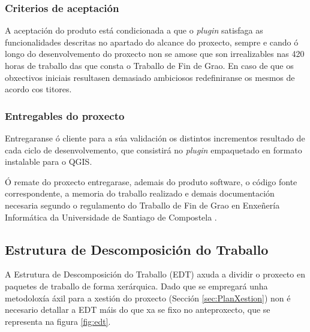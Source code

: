 \subsubsection{Criterios de aceptación}
A aceptación do produto está condicionada a que o \emph{plugin} satisfaga as funcionalidades descritas no apartado do alcance do proxecto, sempre e cando ó longo do desenvolvemento do proxecto non se amose que son irrealizables nas 420 horas de traballo das que consta o Traballo de Fin de Grao. En caso de que os obxectivos iniciais resultasen demasiado ambiciosos redefiniranse os mesmos de acordo cos titores.

\subsubsection{Entregables do proxecto}\label{sss:entregables}
Entregaranse ó cliente para a súa validación os distintos incrementos resultado de cada ciclo de desenvolvemento, que consistirá no \emph{plugin} empaquetado en formato instalable para o QGIS.

Ó remate do proxecto entregarase, ademais do produto software, o código fonte correspondente, a memoria do traballo realizado e demais documentación necesaria segundo o regulamento do Traballo de Fin de Grao en Enxeñería Informática da Universidade de Santiago de Compostela \cite{ReglamentoTFG}.

\subsection{Estrutura de Descomposición do Traballo}
A Estrutura de Descomposición do Traballo (EDT) axuda a dividir o proxecto en paquetes de traballo de forma xerárquica. Dado que se empregará unha metodoloxía áxil para a xestión do proxecto (Sección \ref{sec:PlanXestion}) non é necesario detallar a EDT máis do que xa se fixo no anteproxecto, que se representa na figura \ref{fig:edt}.


